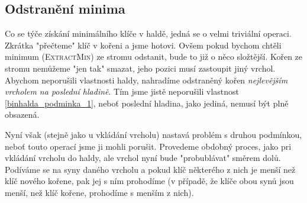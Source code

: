 \subsection{Odstranění minima}

Co se týče získání minimálního klíče v haldě, jedná se o velmi triviální operaci. Zkrátka "přečteme" klíč v kořeni a jsme hotovi. Ovšem pokud bychom chtěli minimum (\textsc{ExtractMin}) ze stromu odstanit, bude to již o něco složtější. Kořen ze stromu nemůžeme "jen tak" smazat, jeho pozici musí zastoupit jiný vrchol. Abychom neporušili vlastnosti haldy, nahradíme odstraněný kořen \emph{nejlevějším vrcholem na poslední hladině}. Tím jsme jistě neporušili vlastnost \ref{binhalda_podminka_1}, neboť poslední hladina, jako jediná, nemusí být plně obsazená.

Nyní však (stejně jako u vkládání vrcholu) nastavá problém s druhou podmínkou, neboť touto operací jsme ji mohli porušit. Provedeme obdobný proces, jako pri vkládání vrcholu do haldy, ale vrchol nyní bude "probublávat" směrem dolů. Podíváme se na syny daného vrcholu a pokud klíč některého z nich je menší než klíč nového kořene, pak jej s ním prohodíme (v případě, že klíče obou synů jsou menší, než klíč kořene, prohodíme s menším z nich).
